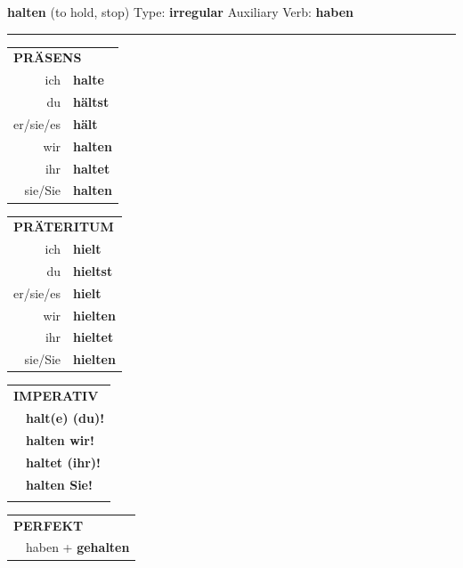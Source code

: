\documentclass[10pt,a4paper]{revtex4-2}
\begin{document}
\begin{verbbox}
    {\Large \bf halten} (to hold, stop) \hfill Type: \textbf{irregular} \hfill Auxiliary Verb: \textbf{haben} 
    
     \vspace{5pt}

    \hrule
    
    \vspace{5pt}

  \begin{tabular}{rl}
     \multicolumn{2}{l}{\textbf{PRÄSENS} }\\
    ich & \textbf{halte}\\
    du & \textbf{hältst}\\
    er/sie/es & \textbf{hält}\\
    wir & \textbf{halten}\\
    ihr & \textbf{haltet}\\
    sie/Sie & \textbf{halten}\\
  \end{tabular}
  \hfill
     \begin{tabular}{rl}
    \multicolumn{2}{l}{\textbf{PRÄTERITUM} }\\
    ich & \textbf{hielt}\\
    du & \textbf{hieltst}\\
    er/sie/es & \textbf{hielt}\\
    wir & \textbf{hielten}\\
    ihr & \textbf{hieltet}\\
    sie/Sie & \textbf{hielten}\\
  \end{tabular}
  \hfill
  \begin{tabular}{rl}
     \multicolumn{2}{l}{\textbf{IMPERATIV} }\\
   & \textbf{halt(e) (du)!}\\
   & \textbf{halten wir!}\\
   & \textbf{haltet (ihr)!}\\
   & \textbf{halten Sie!}\\
   & \vspace{10pt}
  \end{tabular}

    \vspace{10pt}

 \begin{tabular}{rl}
     \multicolumn{2}{l}{\textbf{PERFEKT}}\\
  &  haben + \textbf{gehalten}\\
  \end{tabular}
\hfill
   \begin{tabular}{rl}
   

\end{tabular}
\end{verbbox}
\end{document}
